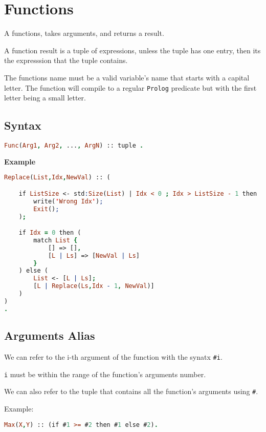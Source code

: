 \section{Functions}


A functions, takes arguments, and returns a result. 

A function result is a tuple of expressions, unless
the tuple has one entry, then its the expresssion 
that the tuple contains.

The functions name must be a valid variable's name that starts with a capital letter.
The function will compile to a regular \texttt{Prolog} predicate but with the
first letter being a small letter.

\subsection{Syntax}

\begin{lstlisting}[language = Prolog]
Func(Arg1, Arg2, ..., ArgN) :: tuple .
\end{lstlisting}


\noindent \textbf{Example}

\begin{lstlisting}[language = Prolog]
Replace(List,Idx,NewVal) :: (

    if ListSize <- std:Size(List) | Idx < 0 ; Idx > ListSize - 1 then (
        write('Wrong Idx');
        Exit();
    );

    if Idx = 0 then (
        match List {
            [] => [],
            [L | Ls] => [NewVal | Ls]
        }
    ) else (
        List <- [L | Ls]; 
        [L | Replace(Ls,Idx - 1, NewVal)]
    )
)
.
\end{lstlisting}



\subsection{Arguments Alias}

We can refer to the i-th argument of the function with
the synatx \texttt{#i}.

\texttt{i} must be within the range of the function's arguments number.

We can also refer to the tuple that contains all the function's 
arguments using \texttt{#}.

Example:

\begin{lstlisting}[language = Prolog]
    Max(X,Y) :: (if #1 >= #2 then #1 else #2).
\end{lstlisting}

